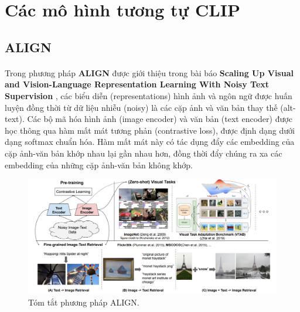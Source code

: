 \newpage
\section{Các mô hình tương tự CLIP}

\subsection{ALIGN} 

\paragraph{}{Trong phương pháp \textbf{ALIGN} được giới thiệu trong bài báo \textbf{Scaling Up Visual and Vision-Language Representation Learning With Noisy Text Supervision} \cite{jia2021scalingvisualvisionlanguagerepresentation}, các biểu diễn (representations) hình ảnh và ngôn ngữ được huấn luyện đồng thời từ dữ liệu nhiễu (noisy) là các cặp ảnh và văn bản thay thế (alt-text). Các bộ mã hóa hình ảnh (image encoder) và văn bản (text encoder) được học thông qua hàm mất mát tương phản (contrastive loss), được định dạng dưới dạng softmax chuẩn hóa. Hàm mất mát này có tác dụng đẩy các embedding của cặp ảnh-văn bản khớp nhau lại gần nhau hơn, đồng thời đẩy chúng ra xa các embedding của những cặp ảnh-văn bản không khớp.\\

}

\begin{figure}[H]
    \centering
    \includegraphics[width=1\linewidth]{img/06-ALIGN.png}
    \caption{Tóm tắt phương pháp ALIGN.}
\end{figure}

